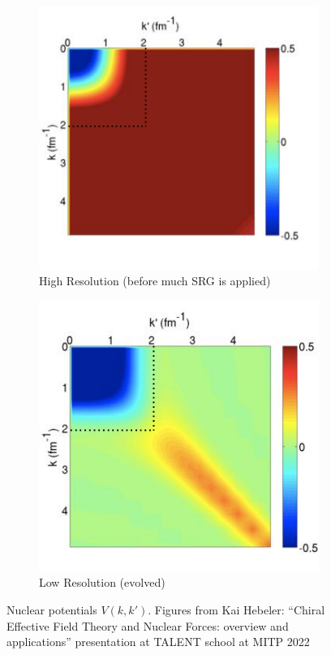 \documentclass[a4paper,11pt]{article}
\begin{document}
\begin{figure}[h]
  \centering
  \begin{subfigure}{0.45\textwidth}
    \centering
    \includegraphics[width=\linewidth]{HighRes.png}
    \caption{High Resolution (before much SRG is applied) }
    \label{fig:highres}
  \end{subfigure}
  \hfill
  \begin{subfigure}{0.45\textwidth}
    \centering
    \includegraphics[width=\linewidth]{LowRes.png}
    \caption{Low Resolution (evolved)}
    \label{fig:lowres}
  \end{subfigure}
  \caption{Nuclear potentials $V(k,k')$. Figures from Kai Hebeler:
    ``Chiral Effective Field Theory and Nuclear Forces:
  overview and applications'' presentation at TALENT school at MITP 2022}
  \label{fig:SRGtransform}
\end{figure}
\end{document}

